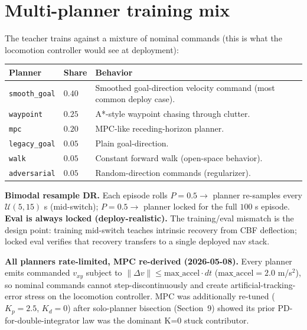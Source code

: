 \documentclass[11pt]{article}
\begin{document}
\section{Multi-planner training mix}

The teacher trains against a mixture of nominal commands (this is what the
locomotion controller would see at deployment):

\begin{small}
\begin{tabularx}{\linewidth}{@{}lXX@{}}
\toprule
Planner                     & Share & Behavior \\
\midrule
\texttt{smooth\_goal}        & $0.40$ & Smoothed goal-direction velocity command (most common deploy case). \\
\texttt{waypoint}            & $0.25$ & A*-style waypoint chasing through clutter. \\
\texttt{mpc}                 & $0.20$ & MPC-like receding-horizon planner. \\
\texttt{legacy\_goal}        & $0.05$ & Plain goal-direction. \\
\texttt{walk}                & $0.05$ & Constant forward walk (open-space behavior). \\
\texttt{adversarial}         & $0.05$ & Random-direction commands (regularizer). \\
\bottomrule
\end{tabularx}
\end{small}

\noindent
\textbf{Bimodal resample DR.} Each episode rolls $P=0.5 \to$ planner
re-samples every $\mathcal{U}(5,15)$ s (mid-switch); $P=0.5 \to$ planner
locked for the full $100$ s episode. \textbf{Eval is always locked
(deploy-realistic).} The training/eval mismatch is the design point:
training mid-switch teaches intrinsic recovery from CBF deflection; locked
eval verifies that recovery transfers to a single deployed nav stack.

\noindent
\textbf{All planners rate-limited, MPC re-derived (2026-05-08).} Every
planner emits commanded $v_{xy}$ subject to $\lVert \Delta v \rVert \leq
\text{max\_accel} \cdot dt$ ($\text{max\_accel} = 2.0$ m/s$^{2}$), so
nominal commands cannot step-discontinuously and create
artificial-tracking-error stress on the locomotion controller. MPC was
additionally re-tuned ($K_p = 2.5$, $K_d = 0$) after solo-planner
bisection (Section~9) showed its prior PD-for-double-integrator law was
the dominant K{=}0 stuck contributor.
\end{document}
